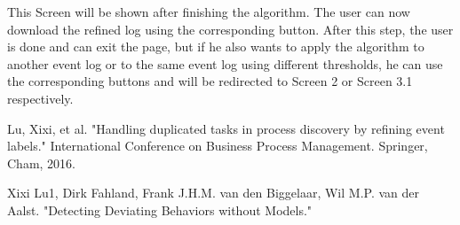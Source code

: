 \documentclass[notitlepage]{article}
\begin{document}
\begin{flushleft}
This Screen will be shown after finishing the algorithm. The user can now download the refined log using the corresponding button. After this step, the user is done and can exit the page, but if he also wants to apply the algorithm to another event log or to the same event log using different thresholds, he can use the corresponding buttons and will be redirected to Screen 2 or Screen 3.1 respectively.


%
%  




\end{flushleft}
%



\begin{thebibliography}{5}
Lu, Xixi, et al. "Handling duplicated tasks in process discovery by refining event labels." International Conference on Business Process Management. Springer, Cham, 2016.

Xixi Lu1, Dirk Fahland, Frank J.H.M. van den Biggelaar, Wil M.P. van der Aalst. "Detecting Deviating Behaviors without Models."


\end{thebibliography}
\end{document}
